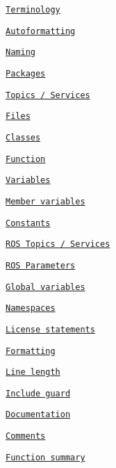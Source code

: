 
\begin{DoxyItemize}
\item \href{#terminology}{\tt Terminology}
\item \href{#autoformatting}{\tt Autoformatting}
\item \href{#naming}{\tt Naming}
\begin{DoxyItemize}
\item \href{#packages}{\tt Packages}
\item \href{#topics--services}{\tt Topics / Services}
\item \href{#files}{\tt Files}
\begin{DoxyItemize}
\item \href{#classes}{\tt Classes}
\item \href{#function}{\tt Function}
\end{DoxyItemize}
\item \href{#variables}{\tt Variables}
\begin{DoxyItemize}
\item \href{#member-variables}{\tt Member variables}
\item \href{#constants}{\tt Constants}
\begin{DoxyItemize}
\item \href{#ros-topics--services}{\tt R\+OS Topics / Services}
\item \href{#ros-parameters}{\tt R\+OS Parameters}
\end{DoxyItemize}
\item \href{#global-variables}{\tt Global variables}
\end{DoxyItemize}
\item \href{#namespaces}{\tt Namespaces}
\end{DoxyItemize}
\item \href{#license-statements}{\tt License statements}
\item \href{#formatting}{\tt Formatting}
\begin{DoxyItemize}
\item \href{#line-length}{\tt Line length}
\end{DoxyItemize}
\item \href{#include-guard}{\tt Include guard}
\item \href{#documentation}{\tt Documentation}
\item \href{#comments}{\tt Comments}
\begin{DoxyItemize}
\item \href{#function-summary}{\tt Function summary}
\end{DoxyItemize}

\end{DoxyItemize}

